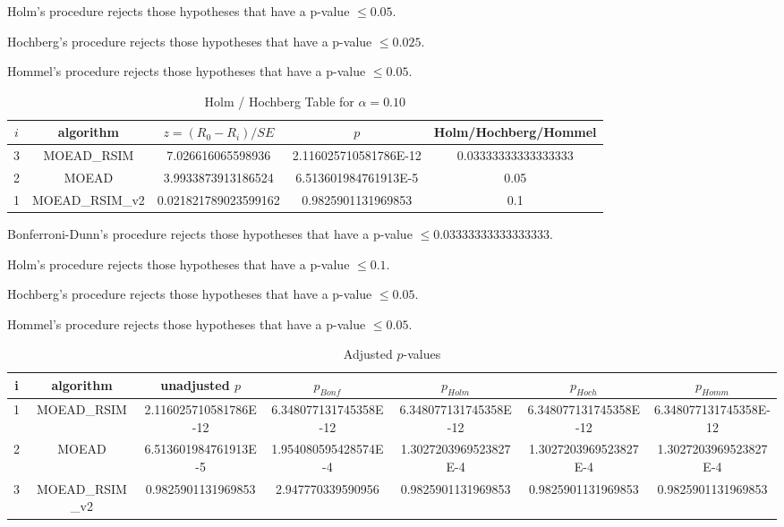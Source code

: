 \documentclass[a4paper,10pt]{article}
\begin{document}
\begin{landscape}
Holm's procedure rejects those hypotheses that have a p-value $\le0.05$.


Hochberg's procedure rejects those hypotheses that have a p-value $\le0.025$.


Hommel's procedure rejects those hypotheses that have a p-value $\le0.05$.


\begin{table}[!htp]
\centering\tiny
\caption{Holm / Hochberg Table for $\alpha=0.10$}
\begin{tabular}{ccccc}
$i$&algorithm&$z=(R_0 - R_i)/SE$&$p$&Holm/Hochberg/Hommel\\
\hline
3&MOEAD_RSIM&7.026616065598936&2.116025710581786E-12&0.03333333333333333\\
2&MOEAD&3.9933873913186524&6.513601984761913E-5&0.05\\
1&MOEAD_RSIM_v2&0.021821789023599162&0.9825901131969853&0.1\\
\hline
\end{tabular}
\end{table}
Bonferroni-Dunn's procedure rejects those hypotheses that have a p-value $\le0.03333333333333333$.


Holm's procedure rejects those hypotheses that have a p-value $\le0.1$.


Hochberg's procedure rejects those hypotheses that have a p-value $\le0.05$.


Hommel's procedure rejects those hypotheses that have a p-value $\le0.05$.


\begin{table}[!htp]
\centering\tiny
\caption{Adjusted $p$-values}
\begin{tabular}{ccccccc}
i&algorithm&unadjusted $p$&$p_{Bonf}$&$p_{Holm}$&$p_{Hoch}$&$p_{Homm}$\\
\hline
1&MOEAD_RSIM&2.116025710581786E-12&6.348077131745358E-12&6.348077131745358E-12&6.348077131745358E-12&6.348077131745358E-12\\
2&MOEAD&6.513601984761913E-5&1.954080595428574E-4&1.3027203969523827E-4&1.3027203969523827E-4&1.3027203969523827E-4\\
3&MOEAD_RSIM_v2&0.9825901131969853&2.947770339590956&0.9825901131969853&0.9825901131969853&0.9825901131969853\\
\hline
\end{tabular}
\end{table}


\end{landscape}
\end{document}
